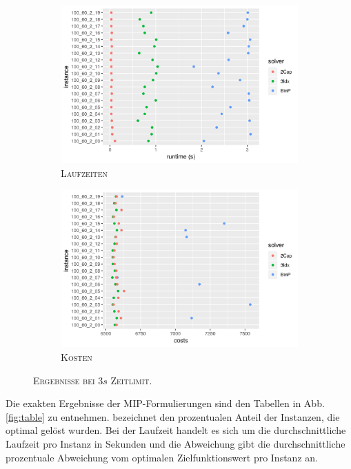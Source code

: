 \begin{figure}[H]
\centering
\begin{subfigure}[b]{0.4\textwidth}
\centering
\includegraphics[width=1.3\textwidth]{img/solver_instance_time_b=2_s_3s.png}
\caption{\textsc{Laufzeiten}}
\label{fig:b=2_s_runtimes}
\end{subfigure}
\hfill
\begin{subfigure}[b]{0.4\textwidth}
\centering
\includegraphics[width=1.3\textwidth]{img/solver_instance_cost_b=2_s_3s.png}
\caption{\textsc{Kosten}}
\label{fig:b=2_s_costs}
\end{subfigure}
\caption{\textsc{Ergebnisse bei $3s$ Zeitlimit}.}
\end{figure}

Die exakten Ergebnisse der MIP-Formulierungen sind den Tabellen in Abb. \ref{fig:table} zu entnehmen.
 bezeichnet den prozentualen Anteil der Instanzen, die optimal gelöst wurden. Bei der Laufzeit handelt
es sich um die durchschnittliche Laufzeit pro Instanz in Sekunden und die Abweichung gibt die durchschnittliche prozentuale Abweichung
vom optimalen Zielfunktionswert pro Instanz an.

